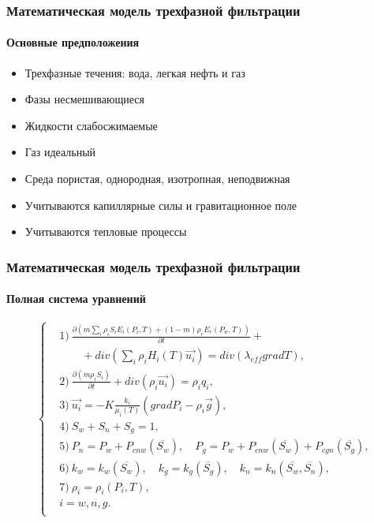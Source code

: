 \begin{frame}
\begin{center}
\frametitle{Математическая модель трехфазной фильтрации}
\framesubtitle{Основные предположения}
\begin{itemize}
\item Трехфазные течения: вода, легкая нефть и газ
\vspace{0.3cm}
\item Фазы несмешивающиеся
\vspace{0.3cm}
\item Жидкости слабосжимаемые
\vspace{0.3cm}
\item Газ идеальный
\vspace{0.3cm}
\item Среда пористая, однородная, изотропная, неподвижная
\vspace{0.3cm}
\item Учитываются капиллярные силы и гравитационное поле
\vspace{0.3cm}
\item Учитываются тепловые процессы
\end{itemize}
\end{center}
\end{frame}

\begin{frame}
\begin{center}
\frametitle{Математическая модель трехфазной фильтрации}
\framesubtitle{Полная система уравнений}
\begin{equation*}
\left\{
  \begin{aligned}
    & \text{1)}\ \frac{\partial \left(m {\sum\limits_{i}{\rho_i S_i E_i(P_i, T)}} + (1-m){\rho_r E_r(P_w, T)}\right)}{\partial t} + \\
    & \qquad + div(\sum_{i}{\rho_i H_i(T) \overrightarrow{u_i}}) = div(\lambda_{eff} grad T),\\
    & \text{2)}\ \frac{\partial (m \rho_i S_i)}{\partial t}+ div(\rho_i \overrightarrow{u_i}) = \rho_i q_i,\\
    & \text{3)}\ \overrightarrow{u_i}=-K \frac{k_i}{{\mu_i(T)}}(grad P_i - {\rho}_i\overrightarrow{g}),\\
    & \text{4)}\ S_w + S_n + S_g=1,\\
    & \text{5)}\ P_n=P_w+P_{cnw}(\overline{S_w}),\quad P_g=P_w+P_{cnw}(\overline{S_w})+P_{cgn}(\overline{S_g}),\\
    & \text{6)}\ k_w=k_w(\overline{S_w}),\quad k_g=k_g(\overline{S_g}),\quad k_n=k_n(\overline{S_w},\overline{S_n}),\\
    & \text{7)}\ \rho_i=\rho_i(P_i,T),\\
    &i=w,n,g. \\
  \end{aligned}
\right.
\end{equation*}
\end{center}
\end{frame}


